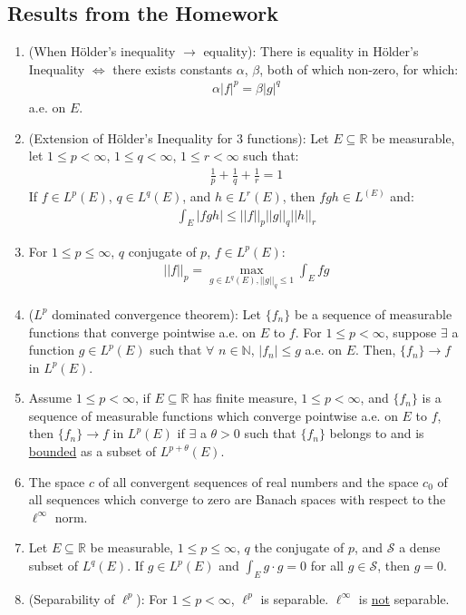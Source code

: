 \documentclass[11pt]{article}
\theoremstyle{definition}
\theoremstyle{definition}
\newcommand{\R}[0]{\mathbb{R}}
\newcommand{\N}[0]{\mathbb{N}}
\newcommand{\idx}[2]{\int_{#1}^{#2}}
\theoremstyle{definition}
\theoremstyle{remark}
\begin{document}
\subsection{Results from the Homework}
\begin{enumerate}[noitemsep]
	\item (When Hölder's inequality $\rightarrow$ equality):  There is equality in Hölder's Inequality $\iff$ there exists constants $\alpha$, $\beta$, both of which non-zero, for which: 
	\begin{align*}
		\alpha |f|^p = \beta |g|^q 
	\end{align*}
	a.e. on $E$. 
	\item (Extension of Hölder's Inequality for 3 functions): Let $E \subseteq \R$ be measurable, let $1 \leq p < \infty$, $1 \leq q < \infty$, $1 \leq r < \infty$ such that: 
	\begin{align*}
		\frac{1}{p} + \frac{1}{q} + \frac{1}{r} = 1
	\end{align*}
	If $f \in L^p(E)$, $q \in L^q(E)$, and $h \in L^r(E)$, then $fgh \in L^(E)$ and: 
	\begin{align*}
		\idx{E}{}  |f g h | \leq ||f||_p ||g||_q ||h||_r 
	\end{align*}
	\item For $1 \leq p \leq \infty$, $q$ conjugate of $p$, $f \in L^p(E)$: 
	\begin{align*}
		||f||_p = \max_{g \in L^q(E), ||g||_q \leq 1} \idx{E}{} f g 
	\end{align*}
	\item ($L^p$ dominated convergence theorem): Let $\{ f_n \}$ be a sequence of measurable functions that converge pointwise a.e. on $E$ to $f$. For $1 \leq p < \infty$, suppose $\exists$ a function $g \in L^p(E)$ such that $\forall$ $n \in \N$, $|f_n| \leq g$ a.e. on $E$. Then, $\{ f_n \} \rightarrow f$ in $L^p(E)$. 
	\item Assume $1 \leq p < \infty$, if $E \subseteq \R$ has finite measure, $1 \leq p < \infty$, and $\{ f_n \}$ is a sequence of measurable functions which converge pointwise a.e. on $E$ to $f$, then $\{ f_n \} \rightarrow f$ in $L^p(E)$ if $\exists$ a $\theta > 0$ such that $\{ f_n \}$ belongs to and is \underline{bounded} as a subset of $L^{p+ \theta} (E)$. 
	\item The space $c$ of all convergent sequences of real numbers and the space $c_0$ of all sequences which converge to zero are Banach spaces with respect to the $\ell^\infty$ norm. 
	\item Let $E \subseteq \R$ be measurable, $1 \leq p \leq \infty$, $q$ the conjugate of $p$, and $\mathcal{S}$ a dense subset of $L^q(E)$. If $g \in L^p(E)$ and $\idx{E}{} g \cdot g =0$ for all $g \in \mathcal{S}$, then $g = 0$. 
	\item (Separability of $\ell^p$): For $1 \leq p < \infty$, $\ell^p$ is separable. $\ell^\infty$ is \underline{not} separable. 
\end{enumerate}
\end{document}
